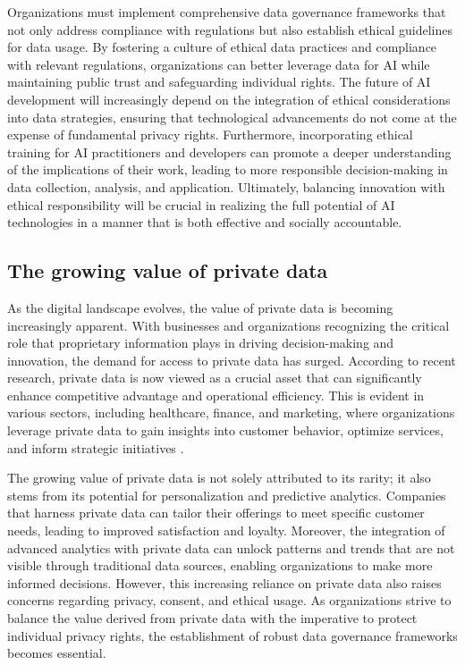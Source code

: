 Organizations must implement comprehensive data governance frameworks that not only address compliance with regulations but also establish ethical guidelines for data usage. By fostering a culture of ethical data practices and compliance with relevant regulations, organizations can better leverage data for AI while maintaining public trust and safeguarding individual rights. The future of AI development will increasingly depend on the integration of ethical considerations into data strategies, ensuring that technological advancements do not come at the expense of fundamental privacy rights. Furthermore, incorporating ethical training for AI practitioners and developers can promote a deeper understanding of the implications of their work, leading to more responsible decision-making in data collection, analysis, and application. Ultimately, balancing innovation with ethical responsibility will be crucial in realizing the full potential of AI technologies in a manner that is both effective and socially accountable.

\subsection{The growing value of private data}
As the digital landscape evolves, the value of private data is becoming increasingly apparent. With businesses and organizations recognizing the critical role that proprietary information plays in driving decision-making and innovation, the demand for access to private data has surged. According to recent research, private data is now viewed as a crucial asset that can significantly enhance competitive advantage and operational efficiency. This is evident in various sectors, including healthcare, finance, and marketing, where organizations leverage private data to gain insights into customer behavior, optimize services, and inform strategic initiatives \cite{17}.

The growing value of private data is not solely attributed to its rarity; it also stems from its potential for personalization and predictive analytics. Companies that harness private data can tailor their offerings to meet specific customer needs, leading to improved satisfaction and loyalty. Moreover, the integration of advanced analytics with private data can unlock patterns and trends that are not visible through traditional data sources, enabling organizations to make more informed decisions. However, this increasing reliance on private data also raises concerns regarding privacy, consent, and ethical usage. As organizations strive to balance the value derived from private data with the imperative to protect individual privacy rights, the establishment of robust data governance frameworks becomes essential. 

